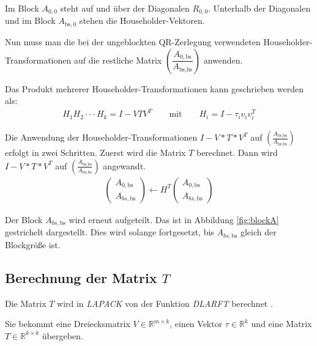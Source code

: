 Im Block $A_{0, 0}$ steht auf und über der Diagonalen $R_{0,0}$. Unterhalb der Diagonalen und im Block $A_{\text{bs}, 0}$ stehen die Householder-Vektoren.

Nun muss man die bei der ungeblockten QR-Zerlegung verwendeten Householder-Transformationen auf die restliche Matrix $ \left(\dfrac{A_{0, \text{bs}}}{A_{\text{bs}, \text{bs}}} \right)$ anwenden.

Das Produkt mehrerer Householder-Transformationen kann geschrieben werden als:
\begin{align*}
H_1H_2 \cdot \cdot \cdot H_k = I - VTV^T \qquad \text{mit}\qquad H_i = I - \tau_i v_iv_i^T
\end{align*}  \cite{Joffrain:2006:AHT:1141885.1141886}

Die Anwendung der Householder-Transformationen $I - V*T*V^T$ auf $\left(\frac{A_{\text{bs}, \text{bs}}}{A_{\text{bs}, \text{bs}}} \right)$ erfolgt in zwei Schritten. Zuerst wird  die Matrix $T$ berechnet. Dann wird $I - V*T*V^T$  auf $\left(\frac{A_{\text{bs}, \text{bs}}}{A_{\text{bs}, \text{bs}}} \right)$ angewandt.
\begin{align}
	\left(\begin{array}{l} 
	A_{0, \text{bs}} \\ \hline
	A_{bs, \text{bs}}
	\end{array}\right)
	\leftarrow
	H^T \left(\begin{array}{l} 
	A_{0, \text{bs}} \\ \hline
	A_{bs, \text{bs}}
	\end{array}\right)
\end{align}

Der Block $A_{bs, \text{bs}}$ wird erneut aufgeteilt. Das ist in Abbildung \ref{fig:blockA} gestrichelt dargestellt.
Dies wird solange fortgesetzt, bis $A_{bs, \text{bs}}$ gleich der Blockgröße ist.

\subsection{Berechnung der Matrix $T$}
Die Matrix $T$ wird in \textit{LAPACK} von der Funktion \textit{DLARFT} berechnet \cite{LARFT}.

Sie bekommt eine Dreiecksmatrix $V \in \mathbb{R}^{m \times k}$, einen Vektor $\tau \in \mathbb{R}^k$ und eine Matrix $T\in \mathbb{R}^{k\times k}$ übergeben. 

